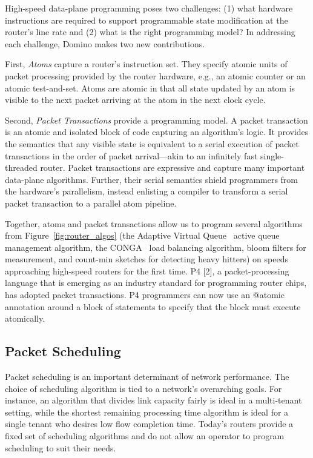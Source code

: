 High-speed data-plane programming poses two challenges: (1) what hardware instructions are required to support programmable state modification at the router’s line rate and (2) what is the right programming model? In addressing each challenge, Domino makes two new contributions.

First, \textit{Atoms} capture a router’s instruction set. They specify atomic
units of packet processing provided by the router hardware, e.g., an atomic
counter or an atomic test-and-set. Atoms are atomic in that all state updated
by an atom is visible to the next packet arriving at the atom in the next clock
cycle.

Second, \textit{Packet Transactions} provide a programming model. A packet
transaction is an atomic and isolated block of code capturing an algorithm’s
logic. It provides the semantics that any visible state is equivalent to a
serial execution of packet transactions in the order of packet arrival—akin to
an infinitely fast single-threaded router. Packet transactions are expressive
and capture many important data-plane algorithms. Further, their serial
semantics shield programmers from the hardware’s parallelism, instead enlisting
a compiler to transform a serial packet transaction to a parallel atom
pipeline.

Together, atoms and packet transactions allow us to program several algorithms
from Figure~\ref{fig:router_algos} (\eg the Adaptive Virtual Queue~\cite{avq}
active queue management algorithm, the CONGA~\cite{conga} load balancing
algorithm, bloom filters for measurement, and count-min sketches for detecting
heavy hitters) on speeds approaching high-speed routers for the first time. P4
[2], a packet-processing language that is emerging as an industry standard for
programming router chips, has adopted packet transactions.  P4 programmers can
now use an @atomic annotation around a block of statements to specify that the
block must execute atomically.

\subsection{Packet Scheduling}

Packet scheduling is an important determinant of network performance. The
choice of scheduling algorithm is tied to a network’s overarching goals. For
instance, an algorithm that divides link capacity fairly is ideal in a
multi-tenant setting, while the shortest remaining processing time algorithm is
ideal for a single tenant who desires low flow completion time. Today’s routers
provide a fixed set of scheduling algorithms and do not allow an operator to
program scheduling to suit their needs.

